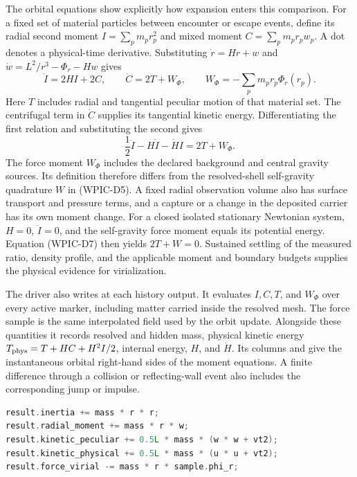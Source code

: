The orbital equations show explicitly how expansion enters this comparison.
For a fixed set of material particles between encounter or escape events,
define its radial second moment \(I=\sum_p m_pr_p^2\) and mixed moment
\(C=\sum_p m_pr_pw_p\). A dot denotes a physical-time derivative.
Substituting \(\dot r=Hr+w\) and
\(\dot w=L^2/r^3-\Phi_r-Hw\) gives
\[
 \dot I=2HI+2C,\qquad
 \dot C=2T+W_\Phi,\qquad
 W_\Phi=-\sum_p m_pr_p\Phi_r(r_p).                    \tag{WPIC-D6}
\]
Here \(T\) includes radial and tangential peculiar motion of that material
set. The centrifugal term in \(\dot C\) supplies its tangential kinetic
energy. Differentiating the first relation and substituting the second gives
\[
 \frac12\ddot I-H\dot I-\dot H I=2T+W_\Phi.           \tag{WPIC-D7}
\]
The force moment \(W_\Phi\) includes the declared background and central
gravity sources. Its definition therefore differs from the resolved-shell
self-gravity quadrature \(W\) in (WPIC-D5). A fixed radial observation volume
also has surface transport and pressure terms, and a capture or a change in
the deposited carrier has its own moment change. For a closed isolated
stationary Newtonian system, \(H=0\), \(\ddot I=0\), and the self-gravity
force moment equals its potential energy. Equation (WPIC-D7) then yields
\(2T+W=0\). Sustained settling of the measured ratio, density profile, and
the applicable moment and boundary budgets supplies the physical evidence
for virialization.

The driver also writes  at each history output.
It evaluates \(I,C,T\), and \(W_\Phi\) over every active marker, including
matter carried inside the resolved mesh. The force sample is the same
interpolated field used by the orbit update. Alongside these quantities it
records resolved and hidden mass, physical kinetic energy
\(T_{\rm phys}=T+HC+H^2I/2\), internal energy, \(H\), and \(\dot H\).
Its columns  and  give the
instantaneous orbital right-hand sides of the moment equations. A finite
difference through a collision or reflecting-wall event also includes the
corresponding jump or impulse.

\begin{lstlisting}[language=C++]
result.inertia += mass * r * r;
result.radial_moment += mass * r * w;
result.kinetic_peculiar += 0.5L * mass * (w * w + vt2);
result.kinetic_physical += 0.5L * mass * (u * u + vt2);
result.force_virial -= mass * r * sample.phi_r;
\end{lstlisting}

